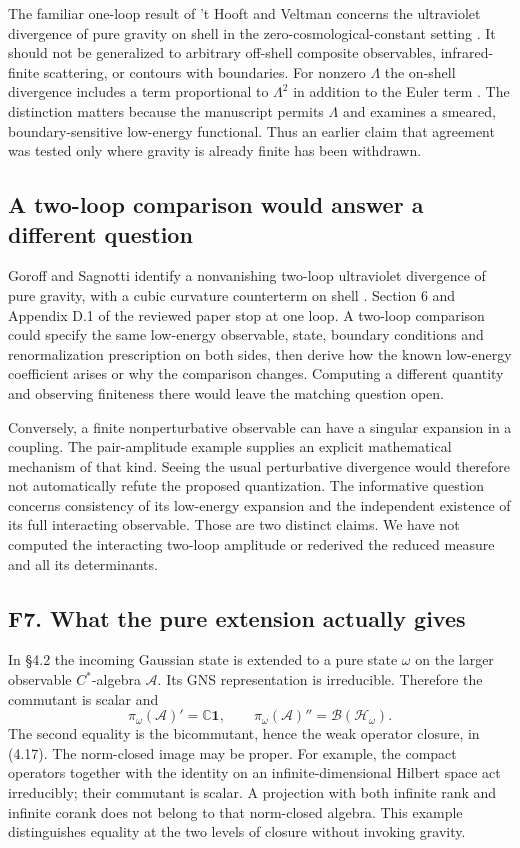 \documentclass[11pt]{article}
\newcommand{\id}{\mathbf{1}}
\begin{document}
The familiar one-loop result of 't Hooft and Veltman concerns the ultraviolet divergence of pure gravity on shell in the zero-cosmological-constant setting \cite{thv}. It should not be generalized to arbitrary off-shell composite observables, infrared-finite scattering, or contours with boundaries. For nonzero $\Lambda$ the on-shell divergence includes a term proportional to $\Lambda^2$ in addition to the Euler term \cite{bps}. The distinction matters because the manuscript permits $\Lambda$ and examines a smeared, boundary-sensitive low-energy functional. Thus an earlier claim that agreement was tested only where gravity is already finite has been withdrawn.

\subsection{A two-loop comparison would answer a different question}
Goroff and Sagnotti identify a nonvanishing two-loop ultraviolet divergence of pure gravity, with a cubic curvature counterterm on shell \cite{gs}. Section 6 and Appendix D.1 of the reviewed paper stop at one loop. A two-loop comparison could specify the same low-energy observable, state, boundary conditions and renormalization prescription on both sides, then derive how the known low-energy coefficient arises or why the comparison changes. Computing a different quantity and observing finiteness there would leave the matching question open.

Conversely, a finite nonperturbative observable can have a singular expansion in a coupling. The pair-amplitude example supplies an explicit mathematical mechanism of that kind. Seeing the usual perturbative divergence would therefore not automatically refute the proposed quantization. The informative question concerns consistency of its low-energy expansion and the independent existence of its full interacting observable. Those are two distinct claims. We have not computed the interacting two-loop amplitude or rederived the reduced measure and all its determinants.

\subsection{F7. What the pure extension actually gives}
In \S4.2 the incoming Gaussian state is extended to a pure state $\omega$ on the larger observable $C^*$-algebra $\mathcal A$. Its GNS representation is irreducible. Therefore the commutant is scalar and
\[
  \pi_\omega(\mathcal A)'=\mathbb C\id,\qquad
  \pi_\omega(\mathcal A)''=\mathcal B(\mathcal H_\omega).
\]
The second equality is the bicommutant, hence the weak operator closure, in (4.17). The norm-closed image may be proper. For example, the compact operators together with the identity on an infinite-dimensional Hilbert space act irreducibly; their commutant is scalar. A projection with both infinite rank and infinite corank does not belong to that norm-closed algebra. This example distinguishes equality at the two levels of closure without invoking gravity.
\end{document}
